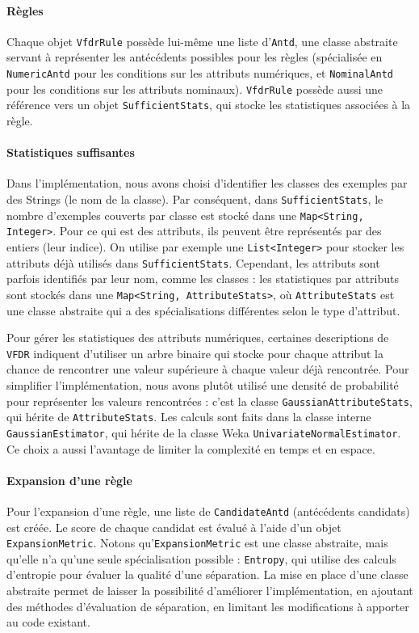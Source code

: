         \paragraph{Règles}Chaque objet \texttt{VfdrRule} possède lui-même une liste d’\texttt{Antd}, une classe abstraite servant à représenter les antécédents possibles pour les règles (spécialisée en \texttt{NumericAntd} pour les conditions sur les attributs numériques, et \texttt{NominalAntd} pour les conditions sur les attributs nominaux). \texttt{VfdrRule} possède aussi une référence vers un objet \texttt{SufficientStats}, qui stocke les statistiques associées à la règle. 


        \paragraph{Statistiques suffisantes} 
            Dans l’implémentation, nous avons choisi d’identifier les classes des exemples par des Strings (le nom de la classe). Par conséquent, dans \texttt{SufficientStats}, le nombre d’exemples couverts par classe est stocké dans une \texttt{Map<String, Integer>}. Pour ce qui est des attributs, ils peuvent être représentés par des entiers (leur indice). On utilise par exemple une \texttt{List<Integer>} pour stocker les attributs déjà utilisés dans \texttt{SufficientStats}. Cependant, les attributs sont parfois identifiés par leur nom, comme les classes : les statistiques par attributs sont stockés dans une \texttt{Map<String, \texttt{AttributeStats}>}, où \texttt{AttributeStats} est une classe abstraite qui a des spécialisations différentes selon le type d’attribut.
            
            Pour gérer les statistiques des attributs numériques, certaines descriptions de \texttt{VFDR} indiquent d’utiliser un arbre binaire qui stocke pour chaque attribut la chance de rencontrer une valeur supérieure à chaque valeur déjà rencontrée. Pour simplifier l’implémentation, nous avons plutôt utilisé une densité de probabilité pour représenter les valeurs rencontrées : c’est la classe \texttt{GaussianAttributeStats}, qui hérite de \texttt{AttributeStats}. Les calculs sont faits dans la classe interne \texttt{GaussianEstimator}, qui hérite de la classe Weka \texttt{UnivariateNormalEstimator}. Ce choix a aussi l’avantage de limiter la complexité en temps et en espace.
        
        \paragraph{Expansion d'une règle} Pour l’expansion d’une règle, une liste de \texttt{CandidateAntd} (antécédents candidats) est créée. Le score de chaque candidat est évalué à l’aide d’un objet \texttt{ExpansionMetric}. Notons qu’\texttt{ExpansionMetric} est une classe abstraite, mais qu’elle n’a qu’une seule spécialisation possible : \texttt{Entropy}, qui utilise des calculs d’entropie pour évaluer la qualité d’une séparation. La mise en place d’une classe abstraite permet de laisser la possibilité d’améliorer l’implémentation, en ajoutant des méthodes d’évaluation de séparation, en limitant les modifications à apporter au code existant.
        
